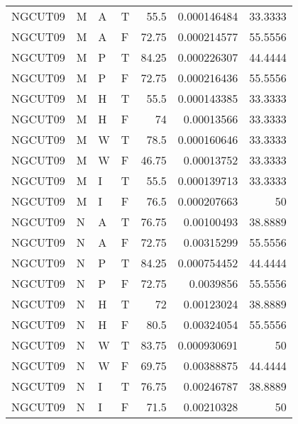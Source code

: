 \begin{tabular}{llllrrr}
    NGCUT09  & M     & A     & T          & 55.5       & 0.000146484 & 33.3333  \\
    NGCUT09  & M     & A     & F          & 72.75      & 0.000214577 & 55.5556  \\
    NGCUT09  & M     & P     & T          & 84.25      & 0.000226307 & 44.4444  \\
    NGCUT09  & M     & P     & F          & 72.75      & 0.000216436 & 55.5556  \\
    NGCUT09  & M     & H     & T          & 55.5       & 0.000143385 & 33.3333  \\
    NGCUT09  & M     & H     & F          & 74         & 0.00013566  & 33.3333  \\
    NGCUT09  & M     & W     & T          & 78.5       & 0.000160646 & 33.3333  \\
    NGCUT09  & M     & W     & F          & 46.75      & 0.00013752  & 33.3333  \\
    NGCUT09  & M     & I     & T          & 55.5       & 0.000139713 & 33.3333  \\
    NGCUT09  & M     & I     & F          & 76.5       & 0.000207663 & 50       \\
    NGCUT09  & N     & A     & T          & 76.75      & 0.00100493  & 38.8889  \\
    NGCUT09  & N     & A     & F          & 72.75      & 0.00315299  & 55.5556  \\
    NGCUT09  & N     & P     & T          & 84.25      & 0.000754452 & 44.4444  \\
    NGCUT09  & N     & P     & F          & 72.75      & 0.0039856   & 55.5556  \\
    NGCUT09  & N     & H     & T          & 72         & 0.00123024  & 38.8889  \\
    NGCUT09  & N     & H     & F          & 80.5       & 0.00324054  & 55.5556  \\
    NGCUT09  & N     & W     & T          & 83.75      & 0.000930691 & 50       \\
    NGCUT09  & N     & W     & F          & 69.75      & 0.00388875  & 44.4444  \\
    NGCUT09  & N     & I     & T          & 76.75      & 0.00246787  & 38.8889  \\
    NGCUT09  & N     & I     & F          & 71.5       & 0.00210328  & 50       \\
    \hline
\end{tabular}